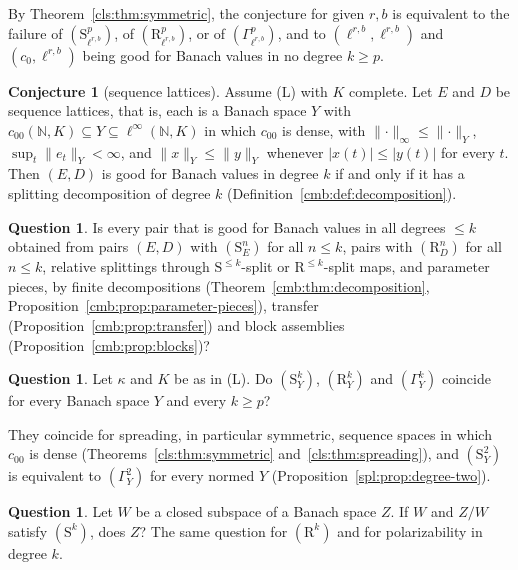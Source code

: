 \documentclass[11pt]{amsart}
\theoremstyle{definition}
\theoremstyle{remark}
\numberwithin{equation}{section}
\newcommand{\N}{\mathbb N}
\newcommand{\linf}{\ell^\infty}
\newcommand{\abs}[1]{\lvert #1\rvert}
\newcommand{\norm}[1]{\lVert #1\rVert}
\theoremstyle{plain}
\theoremstyle{definition}
\newtheorem{conjecture}[theorem]{Conjecture}
\newtheorem{question}[theorem]{Question}
\theoremstyle{plain}
\begin{document}
By Theorem~\ref{cls:thm:symmetric}, the conjecture for given $r,b$ is equivalent to the failure of
$(\mathrm S^p_{\ell^{r,b}})$, of $(\mathrm R^p_{\ell^{r,b}})$, or of $(\Gamma^p_{\ell^{r,b}})$, and to $(\ell^{r,b},\ell^{r,b})$
and $(c_0,\ell^{r,b})$ being good for Banach values in no degree $k\ge p$.

\begin{conjecture}[sequence lattices]\label{q:conj:lattice}
Assume \textup{(L)} with $K$ complete. Let $E$ and $D$ be sequence lattices, that is, each is a Banach space $Y$ with
$c_{00}(\N,K)\subseteq Y\subseteq\linf(\N,K)$ in which $c_{00}$ is dense, with $\norm{\cdot}_\infty\le\norm{\cdot}_Y$,
$\sup_t\norm{e_t}_Y<\infty$, and $\norm x_Y\le\norm y_Y$ whenever $\abs{x(t)}\le\abs{y(t)}$ for every $t$. Then $(E,D)$ is good for Banach values in
degree $k$ if and only if it has a splitting decomposition of degree $k$ (Definition~\ref{cmb:def:decomposition}).
\end{conjecture}

\begin{question}\label{q:quest:generation}
Is every pair that is good for Banach values in all degrees $\le k$ obtained from pairs $(E,D)$ with $(\mathrm S^n_E)$
for all $n\le k$, pairs with $(\mathrm R^n_D)$ for all $n\le k$, relative splittings through $\mathrm S^{\le k}$-split or
$\mathrm R^{\le k}$-split maps, and parameter pieces, by finite decompositions (Theorem~\ref{cmb:thm:decomposition},
Proposition~\ref{cmb:prop:parameter-pieces}), transfer (Proposition~\ref{cmb:prop:transfer}) and block assemblies
(Proposition~\ref{cmb:prop:blocks})?
\end{question}

\begin{question}\label{q:quest:coincide}
Let $\kappa$ and $K$ be as in \textup{(L)}. Do $(\mathrm S^k_Y)$, $(\mathrm R^k_Y)$ and $(\Gamma^k_Y)$ coincide for every
Banach space $Y$ and every $k\ge p$?
\end{question}

They coincide for spreading, in particular symmetric, sequence spaces in which $c_{00}$ is dense
(Theorems~\ref{cls:thm:symmetric} and~\ref{cls:thm:spreading}), and
$(\mathrm S^2_Y)$ is equivalent to $(\Gamma^2_Y)$ for every normed $Y$ (Proposition~\ref{spl:prop:degree-two}).

\begin{question}\label{q:quest:three-space}
Let $W$ be a closed subspace of a Banach space $Z$. If $W$ and $Z/W$ satisfy $(\mathrm S^k)$, does $Z$? The same question
for $(\mathrm R^k)$ and for polarizability in degree $k$.
\end{question}
\end{document}
